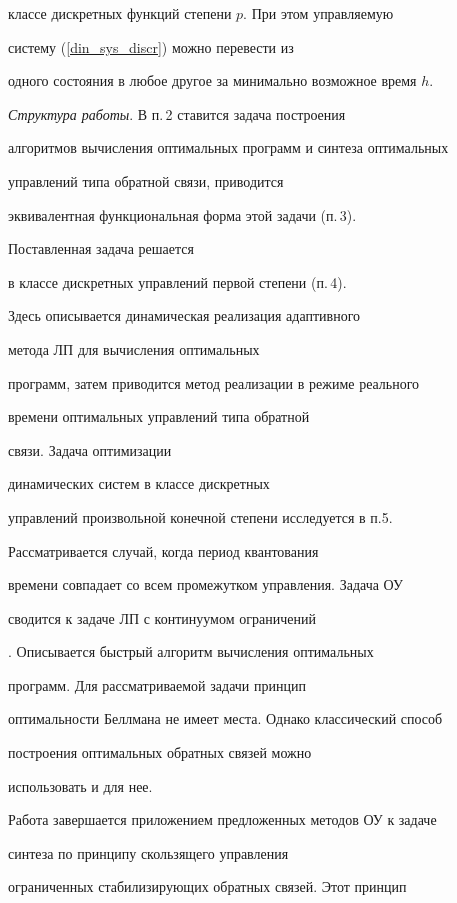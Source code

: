 классе дискретных функций степени $p$. При этом управляемую


систему (\ref{din_sys_discr}) можно перевести из


одного состояния в любое другое за минимально возможное время $h$.





{\it Структура работы}. В п.\,2 ставится задача построения


алгоритмов вычисления оптимальных программ и синтеза оптимальных


управлений типа обратной связи, приводится


эквивалентная функциональная форма этой задачи (п.\,3).


Поставленная задача решается


в классе дискретных управлений первой степени (п.\,4).


Здесь описывается динамическая реализация адаптивного


метода ЛП \cite{KMO1} для вычисления оптимальных


программ, затем приводится метод реализации в режиме реального


времени оптимальных управлений типа обратной


связи. Задача оптимизации


динамических систем в классе дискретных


управлений произвольной конечной степени исследуется в п.5.


Рассматривается случай, когда период квантования


времени совпадает со всем промежутком управления. Задача ОУ


сводится к задаче ЛП с континуумом ограничений


\cite{KMO3}. Описывается быстрый алгоритм вычисления оптимальных


программ. Для рассматриваемой задачи принцип


оптимальности Беллмана не имеет места. Однако классический способ


построения оптимальных обратных связей можно


использовать и для нее.





Работа завершается приложением предложенных методов ОУ к задаче


синтеза по принципу скользящего управления


ограниченных стабилизирующих обратных связей. Этот принцип


